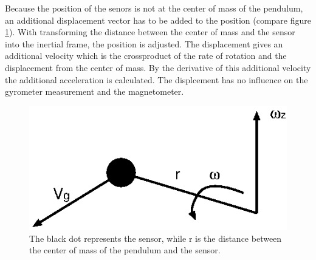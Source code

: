 Because the position of the senors is not at the center of mass of the pendulum, an additional displacement vector has to be added to the position (compare figure \ref{displacement}). With transforming the distance between the center of mass and the sensor into the inertial frame, the position is adjusted. The displacement gives an additional velocity which is the crossproduct of the rate of rotation and the displacement from the center of mass. By the derivative of this additional velocity the additional acceleration is calculated. The displcement has no influence on the gyrometer measurement and the magnetometer.
\begin{figure}[h]
\begin{center}
\includegraphics[width=8 cm]{pictures/displacement_1.eps}
\caption{The black dot represents the sensor, while r is the distance between the center of mass of the pendulum and the sensor.}
\label{displacement}
\end{center}
\end{figure}

